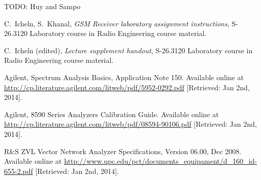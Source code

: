 \documentclass[a4paper, 12pt]{article}
\begin{document}
TODO: Huy and Sampo


\newpage
\begin{thebibliography}{9}%

 C.\ Icheln, S.\ Khanal, 
	\textit{GSM Receiver laboratory assignment instructions},
	S-26.3120 Laboratory course in Radio Engineering course material.
	
\bibitem{} C.\ Icheln (edited), 
	\textit{Lecture supplement handout},
	S-26.3120 Laboratory course in Radio Engineering course material.

 Agilent, Spectrum Analysis Basics, Application Note 150. 
	Available online at \url{http://cp.literature.agilent.com/litweb/pdf/5952-0292.pdf} 
	[Retrieved: Jan 2nd, 2014].
	
 Agilent, 8590 Series Analyzers Calibration Guide.
	Available online at \url{http://cp.literature.agilent.com/litweb/pdf/08594-90106.pdf}
	[Retrieved: Jan 2nd, 2014].
	
 R\&S ZVL Vector Network Analyzer Specifications, 
	Version 06.00, Dec 2008. 
	Available online at \url{http://www.upc.edu/pct/documents_equipament/d_160_id-655-2.pdf} 
	[Retrieved: Jan 2nd, 2014].


	

	

\end{thebibliography}
\end{document}
